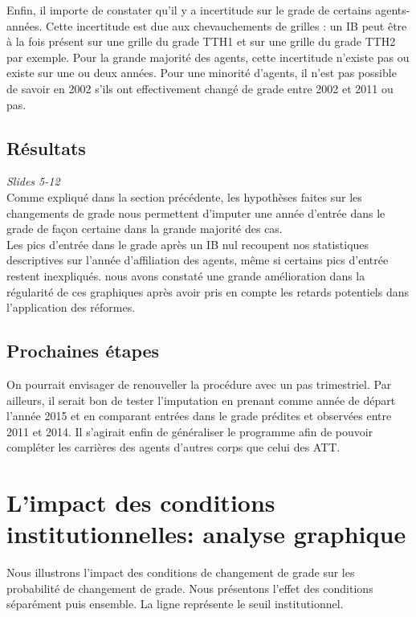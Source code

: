 \documentclass[11pt,a4paper]{article}
\begin{document}
Enfin, il importe de constater qu'il y a incertitude sur le grade de certains agents-années. Cette incertitude est due aux chevauchements de grilles : un IB peut être à la fois présent sur une grille du grade TTH1 et sur une grille du grade TTH2 par exemple. Pour la grande majorité des agents, cette incertitude n'existe pas ou existe sur une ou deux années. Pour une minorité d'agents, il n'est pas possible de savoir en 2002 s'ils ont effectivement changé de grade entre 2002 et 2011 ou pas.\\

\subsection{Résultats}

\textit{Slides 5-12}\\

Comme expliqué dans la section précédente, les hypothèses faites sur les changements de grade nous permettent d'imputer une année d'entrée dans le grade de façon certaine dans la grande majorité des cas.\\

Les pics d'entrée dans le grade après un IB nul recoupent nos statistiques descriptives sur l'année d'affiliation des agents, même si certains pics d'entrée restent inexpliqués. nous avons constaté une grande amélioration dans la régularité de ces graphiques après avoir pris en compte les retards potentiels dans l'application des réformes.

\subsection{Prochaines étapes}

On pourrait envisager de renouveller la procédure avec un pas trimestriel.
Par ailleurs, il serait bon de tester l'imputation en prenant comme année de départ l'année 2015 et en comparant entrées dans le grade prédites et observées entre 2011 et 2014.
Il s'agirait enfin de généraliser le programme afin de pouvoir compléter les carrières des agents d'autres corps que celui des ATT.

\section{L'impact des conditions institutionnelles: analyse graphique}

Nous illustrons l'impact des conditions de changement de grade sur les probabilité de changement de grade. Nous présentons l'effet des conditions séparément puis ensemble. La ligne représente le seuil institutionnel. 
\end{document}
